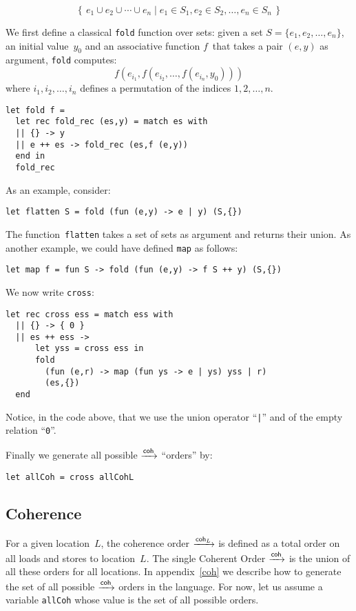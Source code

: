 \documentclass[a4paper]{article}
\begin{document}
$$
\left\{\, e_1 \cup e_2 \cup \cdots \cup e_n \mid
e_1 \in S_1, e_2 \in S_2, \ldots, e_n \in S_n \,\right\}
$$

We first define a classical \texttt{fold} function over sets:
given a set $S = \{ e_1, e_2, \ldots, e_n\}$, an initial value~$y_0$
and an associative function $f$~that takes a pair $(e,y)$ as argument,
\texttt{fold} computes:
$$
f (e_{i_1},f (e_{i_2}, \ldots, f(e_{i_n},y_0)))  
$$
where $i_1, i_2, \ldots, i_n$ defines a permutation
of the indices $1, 2, \ldots, n$.

\begin{verbatim}
let fold f =
  let rec fold_rec (es,y) = match es with
  || {} -> y
  || e ++ es -> fold_rec (es,f (e,y))
  end in
  fold_rec
\end{verbatim}
As an example, consider:
\begin{verbatim}
let flatten S = fold (fun (e,y) -> e | y) (S,{})
\end{verbatim}
The function~\verb+flatten+
takes a set of sets as argument and returns their union.
As another example, we could have defined \texttt{map} as follows:
\begin{verbatim}
let map f = fun S -> fold (fun (e,y) -> f S ++ y) (S,{})
\end{verbatim}

We now write \texttt{cross}:
\begin{verbatim}
let rec cross ess = match ess with
  || {} -> { 0 }
  || es ++ ess ->
      let yss = cross ess in
      fold
        (fun (e,r) -> map (fun ys -> e | ys) yss | r)
        (es,{})           
  end      
\end{verbatim}
Notice, in the code above, that we use the union operator ``\verb+|+'' and of
the empty relation ``\verb+0+''. 

Finally we generate all possible $\xrightarrow{\textsf{\scriptsize{}coh}}$ ``orders'' by:
\begin{verbatim}
let allCoh = cross allCohL
\end{verbatim}

\subsection{\label{coherence}Coherence}

For a given location~$L$, the coherence order $\xrightarrow{\textsf{\scriptsize{}coh$_{L}$}}$ is defined as a total
order on all loads and stores to location~$L$. The single Coherent Order $\xrightarrow{\textsf{\scriptsize{}coh}}$
is the union of all these orders for all locations.  In appendix~\ref{coh} we
describe how to generate the set of all possible $\xrightarrow{\textsf{\scriptsize{}coh}}$ orders in the \cat{}
language.  For now, let us assume a variable \texttt{allCoh} whose value is the
set of all possible \coh{} orders.
\end{document}
